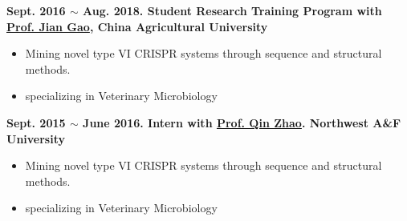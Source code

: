 \textbf{
    Sept. 2016 $\sim$ Aug. 2018. Student Research Training Program with \href{https://cvm.cau.edu.cn/art/2017/9/12/art_41957_71.html}{Prof. Jian Gao}, China Agricultural University
}
\begin{itemize}
    \item Mining novel type VI CRISPR systems through sequence and structural methods.
    \item specializing in Veterinary Microbiology 
\end{itemize}

\textbf{
    Sept. 2015 $\sim$ June 2016. Intern with \href{https://dyxy.nwsuaf.edu.cn/en/People/FullProfessor/5e6012bf013a499c946289472b285795.htm}{Prof. Qin Zhao}. Northwest A\&F University
}
\begin{itemize}
    \item Mining novel type VI CRISPR systems through sequence and structural methods.
    \item specializing in Veterinary Microbiology 
\end{itemize}


